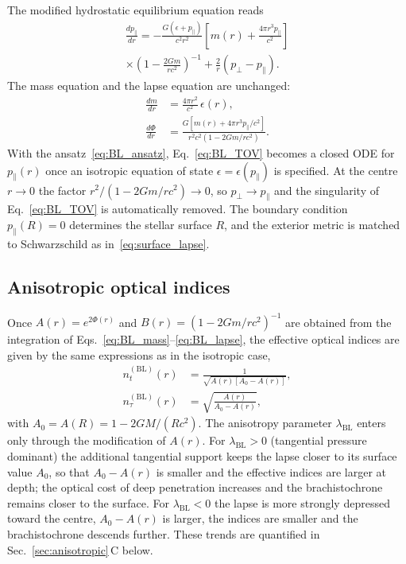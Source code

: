 \documentclass[
  aps,
  prd,
  twocolumn,
  nofootinbib,
  superscriptaddress,
  longbibliography
]{revtex4-2}
\begin{document}
The modified hydrostatic equilibrium equation reads
\begin{multline}
\frac{dp_\parallel}{dr}
=
-\frac{G(\epsilon+p_\parallel)}{c^2r^2}
\left[m(r)+\frac{4\pi r^3p_\parallel}{c^2}\right]
\\
\times\left(1-\frac{2Gm}{rc^2}\right)^{-1}
+\frac{2}{r}(p_\perp-p_\parallel).
\label{eq:BL_TOV}
\end{multline}
The mass equation and the lapse equation are unchanged:
\begin{align}
\frac{dm}{dr}
&=
\frac{4\pi r^2}{c^2}\,\epsilon(r),
\label{eq:BL_mass}
\\
\frac{d\Phi}{dr}
&=
\frac{G\left[m(r)+4\pi r^3p_\parallel/c^2\right]}
{r^2c^2\left(1-2Gm/rc^2\right)}.
\label{eq:BL_lapse}
\end{align}
With the ansatz~\eqref{eq:BL_ansatz}, Eq.~\eqref{eq:BL_TOV} becomes a
closed ODE for $p_\parallel(r)$ once an isotropic equation of state
$\epsilon=\epsilon(p_\parallel)$ is specified.
At the centre $r\to0$ the factor $r^2/(1-2Gm/rc^2)\to0$, so $p_\perp\to p_\parallel$ and the singularity of Eq.~\eqref{eq:BL_TOV} is automatically removed.
The boundary condition $p_\parallel(R)=0$ determines the stellar surface $R$, and the exterior metric is matched to Schwarzschild as in~\eqref{eq:surface_lapse}.

\subsection{Anisotropic optical indices}

Once $A(r)=e^{2\Phi(r)}$ and $B(r)=(1-2Gm/rc^2)^{-1}$ are obtained
from the integration of Eqs.~\eqref{eq:BL_mass}--\eqref{eq:BL_lapse},
the effective optical indices are given by the same expressions as in
the isotropic case,
\begin{equation}
\begin{aligned}
n_t^{(\mathrm{BL})}(r)
&=
\frac{1}{\sqrt{A(r)\left[A_0-A(r)\right]}},
\\[4pt]
n_\tau^{(\mathrm{BL})}(r)
&=
\sqrt{\frac{A(r)}{A_0-A(r)}},
\end{aligned}
\end{equation}
with $A_0=A(R)=1-2GM/(Rc^2)$. The anisotropy parameter
$\lambda_{\mathrm{BL}}$ enters only through the modification of
$A(r)$. For $\lambda_{\mathrm{BL}}>0$ (tangential pressure dominant)
the additional tangential support keeps the lapse closer to its
surface value $A_0$, so that $A_0-A(r)$ is smaller and the effective
indices are larger at depth; the optical cost of deep penetration
increases and the brachistochrone remains closer to the surface. For
$\lambda_{\mathrm{BL}}<0$ the lapse is more strongly depressed toward
the centre, $A_0-A(r)$ is larger, the indices are smaller and the
brachistochrone descends further. These trends are quantified in
Sec.~\ref{sec:anisotropic}\,C below.
\end{document}
